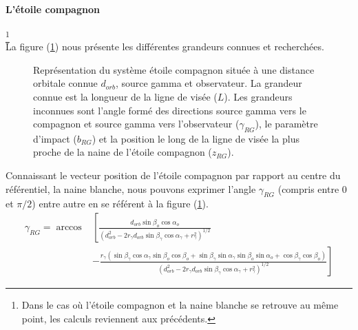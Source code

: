 \documentclass[a4paper,12pt,twoside]{article}
\begin{document}
\paragraph*{L'étoile compagnon}\footnote{Dans le cas où l'étoile compagnon et la naine blanche se retrouve au même point, les calculs reviennent aux précédents.} \hspace{0pt} \\
La figure (\ref{fig: RG}) nous présente les différentes grandeurs connues et recherchées.

\begin{figure}[H]
	\centering
    \caption{Représentation du système étoile compagnon située à une distance orbitale connue $d_{orb}$, source gamma et observateur. La grandeur connue est la longueur de la ligne de visée ($L$). Les grandeurs inconnues sont l'angle formé des directions source gamma vers le compagnon et source gamma vers l'observateur ($\gamma_{RG}$), le paramètre d'impact ($b_{RG}$) et la position le long de la ligne de visée la plus proche de la naine de l'étoile compagnon ($z_{RG}$).}
    \label{fig: RG}
\end{figure}
Connaissant le vecteur position de l'étoile compagnon par rapport au centre du référentiel, la naine blanche, nous pouvons exprimer l'angle $\gamma_{RG}$ (compris entre 0 et $\pi/2$) entre autre en se référent à la figure (\ref{fig: RG}).
\begin{equation}
\begin{split}
	\gamma_{RG} = \arccos &\left[\frac{d_{orb}\sin\beta_o\cos\alpha_o}{\left(d_{orb}^2 - 2 r_\gamma d_{orb} \sin\beta_\gamma\cos\alpha_\gamma + r_\gamma^2 \right)^{1/2}} \right. \\
    &\left. -\frac{r_\gamma (\sin\beta_\gamma\cos\alpha_\gamma\sin\beta_o\cos\beta_o + \sin\beta_\gamma\sin\alpha_\gamma\sin\beta_o\sin\alpha_o + \cos\beta_\gamma\cos\beta_o)}{\left(d_{orb}^2 - 2 r_\gamma d_{orb} \sin\beta_\gamma\cos\alpha_\gamma + r_\gamma^2 \right)^{1/2}}\right]
\end{split}
\label{eq: gamma_RG}
\end{equation}
\end{document}
